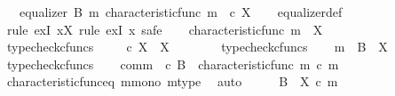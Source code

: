 \begin{isabellebody}
\ \ \ {\isachardoublequoteopen}equalizer\ B\ m\ {\isacharparenleft}{\kern0pt}characteristic{\isacharunderscore}{\kern0pt}func\ m{\isacharparenright}{\kern0pt}\ {\isacharparenleft}{\kern0pt}{\isasymt}\ {\isasymcirc}\isactrlsub c\ {\isasymbeta}\isactrlbsub X\isactrlesub {\isacharparenright}{\kern0pt}{\isachardoublequoteclose}\isanewline
%
\isadelimproof
\ \ %
\endisadelimproof
%
\isatagproof
{}\isamarkupfalse%
\ equalizer{\isacharunderscore}{\kern0pt}def\isanewline
{}\isamarkupfalse%
\ {\isacharparenleft}{\kern0pt}rule\ exI{\isacharbrackleft}{\kern0pt}\ x{\isacharequal}{\kern0pt}X{\isacharbrackright}{\kern0pt}{\isacharcomma}{\kern0pt}\ rule\ exI{\isacharbrackleft}{\kern0pt}\ x{\isacharequal}{\kern0pt}{\isasymOmega}{\isacharbrackright}{\kern0pt}{\isacharcomma}{\kern0pt}\ safe{\isacharparenright}{\kern0pt}\isanewline
\ \ \isamarkupfalse%
\ {\isachardoublequoteopen}characteristic{\isacharunderscore}{\kern0pt}func\ m\ {\isacharcolon}{\kern0pt}\ X\ {\isasymrightarrow}\ {\isasymOmega}{\isachardoublequoteclose}\isanewline
\ \ \ \ \isamarkupfalse%
\ typecheck{\isacharunderscore}{\kern0pt}cfuncs\isanewline
\ \ \isamarkupfalse%
\ {\isachardoublequoteopen}{\isasymt}\ {\isasymcirc}\isactrlsub c\ {\isasymbeta}\isactrlbsub X\isactrlesub \ {\isacharcolon}{\kern0pt}\ X\ {\isasymrightarrow}\ {\isasymOmega}{\isachardoublequoteclose}\isanewline
\ \ \ \ \isamarkupfalse%
\ typecheck{\isacharunderscore}{\kern0pt}cfuncs\isanewline
\ \ \isamarkupfalse%
\ {\isachardoublequoteopen}m\ {\isacharcolon}{\kern0pt}\ B\ {\isasymrightarrow}\ X{\isachardoublequoteclose}\isanewline
\ \ \ \ \isamarkupfalse%
\ typecheck{\isacharunderscore}{\kern0pt}cfuncs\isanewline
\ \ \isamarkupfalse%
\ comm{\isacharcolon}{\kern0pt}\ {\isachardoublequoteopen}{\isasymt}\ {\isasymcirc}\isactrlsub c\ {\isasymbeta}\isactrlbsub B\isactrlesub \ {\isacharequal}{\kern0pt}\ characteristic{\isacharunderscore}{\kern0pt}func\ m\ {\isasymcirc}\isactrlsub c\ m{\isachardoublequoteclose}\isanewline
\ \ \ \ \isamarkupfalse%
\ characteristic{\isacharunderscore}{\kern0pt}func{\isacharunderscore}{\kern0pt}eq\ m{\isacharunderscore}{\kern0pt}mono\ m{\isacharunderscore}{\kern0pt}type\ \isamarkupfalse%
\ auto\isanewline
\ \ \isamarkupfalse%
\ \isamarkupfalse%
\ {\isachardoublequoteopen}{\isasymbeta}\isactrlbsub B\isactrlesub \ {\isacharequal}{\kern0pt}\ {\isasymbeta}\isactrlbsub X\isactrlesub \ {\isasymcirc}\isactrlsub c\ m{\isachardoublequoteclose}\isanewline

\end{isabellebody}

